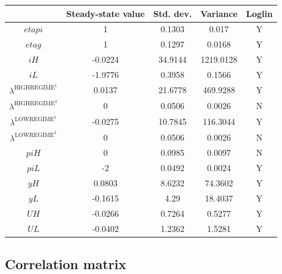 \begin{tabular}{c|c|c|c|c|}
  & Steady-state value & Std. dev. & Variance & Loglin\\
\hline
${e\!t\!a\!p\!i}$ & 1 & 0.1303 & 0.017 & Y    \\
${e\!t\!a\!g}$ & 1 & 0.1297 & 0.0168 & Y    \\
${i\!H}$ & -0.0224 & 34.9144 & 1219.0128 & Y    \\
${i\!L}$ & -1.9776 & 0.3958 & 0.1566 & Y    \\
$\lambda^{\mathrm{HIGHREGIME}^{\mathrm{1}}}$ & 0.0137 & 21.6778 & 469.9288 & Y    \\
$\lambda^{\mathrm{HIGHREGIME}^{\mathrm{2}}}$ & 0 & 0.0506 & 0.0026 & N    \\
$\lambda^{\mathrm{LOWREGIME}^{\mathrm{1}}}$ & -0.0275 & 10.7845 & 116.3044 & Y    \\
$\lambda^{\mathrm{LOWREGIME}^{\mathrm{2}}}$ & 0 & 0.0506 & 0.0026 & N    \\
${p\!i\!H}$ & 0 & 0.0985 & 0.0097 & N    \\
${p\!i\!L}$ & -2 & 0.0492 & 0.0024 & Y    \\
${y\!H}$ & 0.0803 & 8.6232 & 74.3602 & Y    \\
${y\!L}$ & -0.1615 & 4.29 & 18.4037 & Y    \\
${U\!H}$ & -0.0266 & 0.7264 & 0.5277 & Y    \\
${U\!L}$ & -0.0402 & 1.2362 & 1.5281 & Y    \\
\hline
\end{tabular}


\subsection{Correlation matrix}

